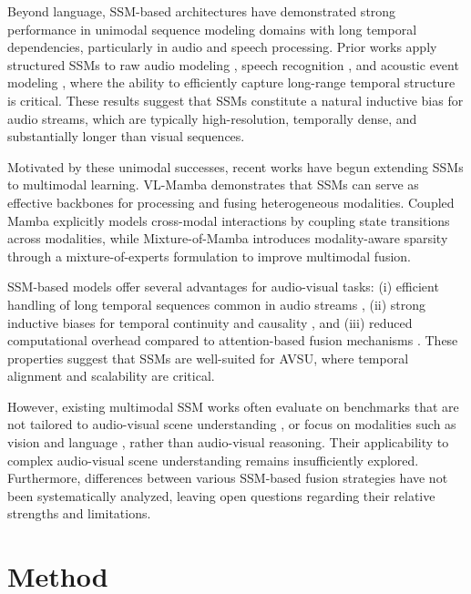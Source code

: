 \documentclass[a4paper,12pt]{extarticle}
\begin{document}
Beyond language, SSM-based architectures have demonstrated strong performance in unimodal sequence modeling domains with long temporal dependencies, particularly in audio and speech processing. Prior works apply structured SSMs to raw audio modeling \cite{goel2022sashimi}, speech recognition \cite{gupta2023dssformer}, and acoustic event modeling \cite{erol2024audiomamba}, where the ability to efficiently capture long-range temporal structure is critical. These results suggest that SSMs constitute a natural inductive bias for audio streams, which are typically high-resolution, temporally dense, and substantially longer than visual sequences.

Motivated by these unimodal successes, recent works have begun extending SSMs to multimodal learning.  VL-Mamba \cite{zhu2024vlmamba} demonstrates that SSMs can serve as effective backbones for processing and fusing heterogeneous modalities. Coupled Mamba \cite{coupledmamba2024} explicitly models cross-modal interactions by coupling state transitions across modalities, while Mixture-of-Mamba \cite{mixturemamba2025} introduces modality-aware sparsity through a mixture-of-experts \cite{shazeer2017outrageously} formulation to improve multimodal fusion.

SSM-based models offer several advantages for audio-visual tasks: (i) efficient handling of long temporal sequences common in audio streams \cite{erol2024audiomamba}, (ii) strong inductive biases for temporal continuity and causality \cite{gu2021s4}, and (iii) reduced computational overhead compared to attention-based fusion mechanisms \cite{dao2024mamba}. These properties suggest that SSMs are well-suited for AVSU, where temporal alignment and scalability are critical.

However, existing multimodal SSM works often evaluate on benchmarks that are not tailored to audio-visual scene understanding \cite{coupledmamba2024}, or focus on modalities such as vision and language \cite{zhu2024vlmamba, mixturemamba2025}, rather than audio-visual reasoning. Their applicability to complex audio-visual scene understanding remains insufficiently explored. Furthermore, differences between various SSM-based fusion strategies have not been systematically analyzed, leaving open questions regarding their relative strengths and limitations.

\section{Method}
\end{document}

